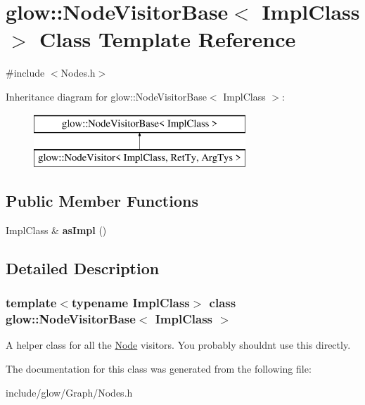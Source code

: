 \hypertarget{classglow_1_1_node_visitor_base}{}\section{glow\+:\+:Node\+Visitor\+Base$<$ Impl\+Class $>$ Class Template Reference}
\label{classglow_1_1_node_visitor_base}


{\ttfamily \#include $<$Nodes.\+h$>$}

Inheritance diagram for glow\+:\+:Node\+Visitor\+Base$<$ Impl\+Class $>$\+:\begin{figure}[H]
\begin{center}
\leavevmode
\includegraphics[height=2.000000cm]{classglow_1_1_node_visitor_base}
\end{center}
\end{figure}
\subsection*{Public Member Functions}
\begin{DoxyCompactItemize}
\item 
\mbox{\label{classglow_1_1_node_visitor_base_a514ef9456e5679d8837e80ebef67e082}} 
Impl\+Class \& {\bfseries as\+Impl} ()
\end{DoxyCompactItemize}


\subsection{Detailed Description}
\subsubsection*{template$<$typename Impl\+Class$>$\newline
class glow\+::\+Node\+Visitor\+Base$<$ Impl\+Class $>$}

A helper class for all the \hyperlink{classglow_1_1_node}{Node} visitors. You probably shouldn\textquotesingle{}t use this directly. 

The documentation for this class was generated from the following file\+:\begin{DoxyCompactItemize}
\item 
include/glow/\+Graph/Nodes.\+h\end{DoxyCompactItemize}
